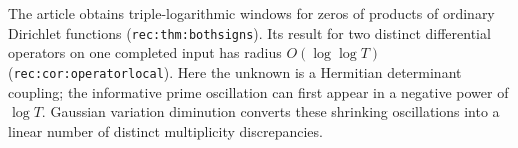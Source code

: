 The article obtains triple-logarithmic windows for zeros of products of
ordinary Dirichlet functions (\texttt{rec:thm:bothsigns}). Its result for
two distinct differential operators on one completed input has radius
$O(\log\log T)$ (\texttt{rec:cor:operatorlocal}). Here the unknown is a
Hermitian determinant coupling; the informative prime oscillation can first
appear in a negative power of $\log T$. Gaussian variation diminution
converts these shrinking oscillations into a linear number of distinct
multiplicity discrepancies.
